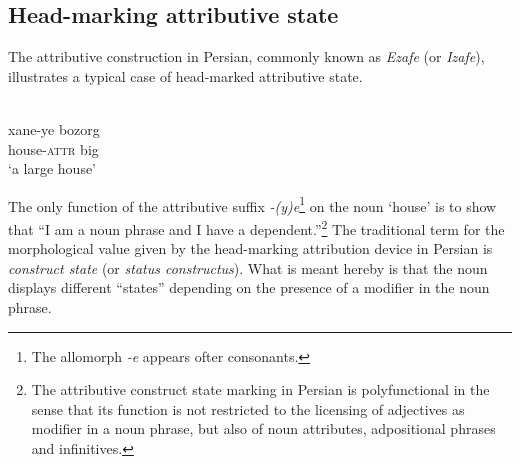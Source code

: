 \subsection{Head-marking attributive state } \label{head-marking state}

The attributive construction in Persian, commonly known as \emph{Ezafe} (or \emph{Izafe}), illustrates a typical case of head-marked attributive state.
\begin{exe}
\ex \label{persian constr state}
\\
\gll xane-ye bozorg\\
	house-\textsc{attr} big\\
\glt 	‘a large house’
\end{exe}
The only function of the attributive suffix \textit{-(y)e}\footnote{The allomorph \textit{-e} appears ofter consonants.} on the noun ‘house’ is to show that “I am a noun phrase and I have a dependent.”\footnote{The attributive construct state marking in Persian is polyfunctional in the sense that its function is not restricted to the licensing of adjectives as modifier in a noun phrase, but also of noun attributes, adpositional phrases and infinitives.} The traditional term for the morphological value given by the head-marking attribution device in Persian is \emph{construct state} (or \emph{status constructus}). What is meant hereby is that the noun displays different “states” depending on the presence of a modifier in the noun phrase.

